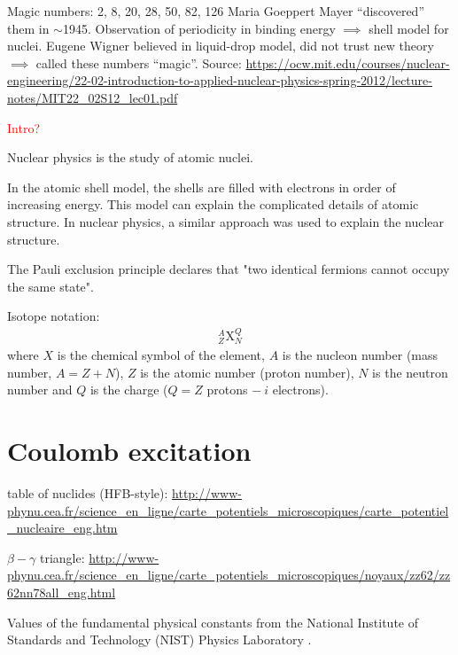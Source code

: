 \documentclass[twoside,english]{uiofysmaster/uiofysmaster}
\begin{document}
Magic numbers: 2, 8, 20, 28, 50, 82, 126 \newline
Maria Goeppert Mayer “discovered” them in $\sim$1945. Observation of periodicity in binding energy $\implies$ shell model for nuclei. \newline
Eugene Wigner believed in liquid-drop model, did not trust new theory $\implies$ called these numbers “magic”. \newline
Source: \url{https://ocw.mit.edu/courses/nuclear-engineering/22-02-introduction-to-applied-nuclear-physics-spring-2012/lecture-notes/MIT22_02S12_lec01.pdf}


\bigskip
\textcolor{red}{Intro?}

Nuclear physics is the study of atomic nuclei. 

In the atomic shell model, the shells are filled with electrons in order of increasing energy. 
This model can explain the complicated details of atomic structure.  
In nuclear physics, a similar approach was used to explain the nuclear structure. \cite{Krane}


The Pauli exclusion principle declares that "two identical fermions cannot occupy the same state". \cite{Griffiths}

Isotope notation:
\begin{align*}
	^A_Z\text{X}_N^Q
\end{align*}
where $X$ is the chemical symbol of the element, $A$ is the nucleon number (mass number, $A = Z + N$), $Z$ is the atomic number (proton number), $N$ is the neutron number and $Q$ is the charge ($Q = Z$ protons $- ~i$ electrons). 


\bigskip

\section{Coulomb excitation}



\bigskip

table of nuclides (HFB-style): \url{http://www-phynu.cea.fr/science_en_ligne/carte_potentiels_microscopiques/carte_potentiel_nucleaire_eng.htm}

$\beta-\gamma$ triangle: \url{http://www-phynu.cea.fr/science_en_ligne/carte_potentiels_microscopiques/noyaux/zz62/zz62nn78all_eng.html}

\begin{table}[ht] 
    \centering 
    \caption{Values of the fundamental physical constants from the National Institute of Standards and Technology (NIST) Physics Laboratory \cite{units}.}
	
	\label{tab:units}
\end{table}
\end{document}
